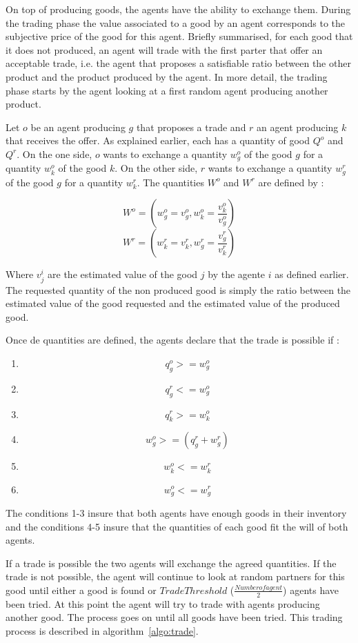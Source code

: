 \documentclass{wscpaperproc}
\begin{document}
On top of producing goods, the agents have the ability to exchange them. During the trading phase the value associated to a good by an agent corresponds to the subjective price of the good for this agent. Briefly summarised, for each good that it does not produced, an agent will trade with the first parter that offer an acceptable trade, i.e. the agent that proposes a satisfiable ratio between the other product and the product produced by the agent. In more detail, the trading phase starts by the agent looking at a first random agent producing another product. 

Let $o$ be an agent producing $g$ that proposes a trade and $r$ an agent producing $k$ that receives the offer. As explained earlier, each has a quantity of good $Q^o$ and $Q^r$. On the one side, $o$ wants to exchange a quantity $w_g^o$ of the good $g$ for a quantity $w_k^o$ of the good $k$. On the other side, $r$ wants to exchange a quantity $w_g^r$ of the good $g$ for a quantity $w_k^r$. The quantities $W^o$ and $W^r$ are defined by :  

 $$ W^o=(w_g^o = v_g^o,w_k^o= \frac{v_k^o}{v_g^o}) $$ 
 $$ W^r=(w_k^r = v_k^r,w_g^r= \frac{v_g^r}{v_k^r}) $$

 Where $v_j^i$ are the estimated value of the good $j$ by the agente $i$ as defined earlier. 
The requested quantity of the non produced good is simply the ratio between the estimated value of the good requested and the estimated value of the produced good.


Once de quantities are defined, the agents declare that the trade is possible if :
\begin{enumerate}
	\item  $$ q_g^o >= w_g^o $$
	\item  $$ q_g^r <= w_g^o $$
	\item  $$ q_k^r >= w_k^o $$
	\item  $$w_g^o>=(q_g^r+w_g^r)$$
	\item  $$w_k^o<=w_k^r$$
	\item  $$w_g^o<=w_g^r$$
\end{enumerate}

The conditions 1-3 insure that both agents have enough goods in their inventory and the conditions 4-5 insure that the quantities of each good fit the will of both agents.



If a trade is possible the two agents will exchange the agreed quantities. If the trade is not possible, the agent will continue to look at random partners for this good until either a good is found or $TradeThreshold$ ($\frac{Number of agent}{2}$) agents have been tried. At this point the agent will try to trade with agents producing another good. The process goes on until all goods have been tried. This trading process is described in algorithm~\ref{algo:trade}.
\end{document}
